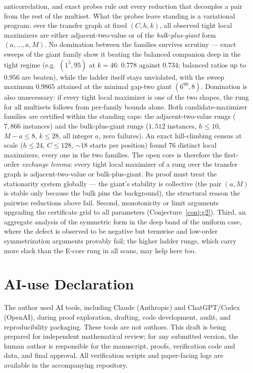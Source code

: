 \documentclass[11pt]{article}
\theoremstyle{definition}
\begin{document}
anticorrelation, and exact probes rule out every reduction that
decouples a pair from the rest of the multiset.  What the probes
leave standing is a variational program: over the transfer graph
at fixed $(C,h,k)$, all observed tight local maximizers are
either adjacent-two-value or of the
\emph{bulk-plus-giant} form $(a,\dots,a,M)$.  No domination
between the families survives scrutiny --- exact sweeps of the
giant family show it beating the balanced companion deep in the
tight regime (e.g.\ $(1^5,95)$ at $k=46$: $0.778$ against
$0.734$; balanced ratios up to $0.956$ are beaten), while the
ladder itself stays unviolated, with the sweep maximum $0.9865$
attained at the minimal gap-two giant $(6^{99},8)$.  Domination
is also unnecessary: if every tight local maximizer is one of the
two shapes, the rung for all multisets follows from per-family
bounds alone.  Both candidate-maximizer families are certified within the
standing caps: the adjacent-two-value rungs ($7{,}866$ instances)
and the bulk-plus-giant rungs ($1{,}512$ instances, $h\le10$,
$M-a\le8$, $k\le28$, all integer $a$, zero failures).  An exact
hill-climbing census at scale ($h\le24$, $C\le128$, $\sim18$
starts per position) found $76$ distinct local maximizers, every
one in the two families.  The open core is therefore the
first-order \emph{exchange lemma}: every tight local maximizer of
a rung over the transfer graph is adjacent-two-value or
bulk-plus-giant.  Its proof must treat the stationarity system
globally --- the giant's stability is collective (the pair
$(a,M)$ is stable only because the bulk pins the background), the
structural reason the pairwise reductions above fail.  Second,
monotonicity or limit arguments
upgrading the certificate grid to all parameters
(Conjecture~\ref{conj:g2}).  Third, an aggregate analysis of the
symmetric form in the deep band of the uniform case, where the defect
is observed to be negative but termwise and low-order symmetrization
arguments provably fail; the higher ladder rungs, which carry more
slack than the E-core rung in all scans, may help here too.

\section*{AI-use Declaration}

The author used AI tools, including Claude (Anthropic) and ChatGPT/Codex
(OpenAI), during proof exploration, drafting, code development, audit, and
reproducibility packaging.  These tools are not authors.  This draft is being
prepared for independent mathematical review; for any submitted version, the
human author is responsible for the manuscript, proofs, verification code and
data, and final approval.  All verification scripts and paper-facing logs are
available in the accompanying repository.
\end{document}
